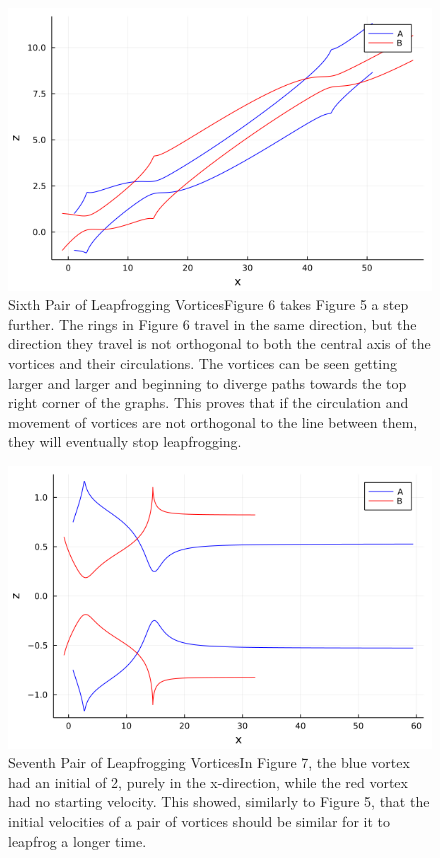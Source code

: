 \documentclass{article}
\begin{document}
\begin{figure}[htb]
	\centering
	\includegraphics[width=\textwidth]{Graph_F.png}
	\caption{Sixth Pair of Leapfrogging Vortices\newline     Figure 6 takes Figure 5 a step further. The rings in Figure 6 travel in the same direction, but the direction they travel is not orthogonal to both the central axis of the vortices and their circulations. The vortices can be seen getting larger and larger and beginning to diverge paths towards the top right corner of the graphs. This proves that if the circulation and movement of vortices are not orthogonal to the line between them, they will eventually stop leapfrogging.}
	\label{fig:vortexpaths}
\end{figure} 

\begin{figure}[htb]
	\centering
	\includegraphics[width=\textwidth]{Graph_G.png}
	\caption{Seventh Pair of Leapfrogging Vortices\newline     In Figure 7, the blue vortex had an initial of 2, purely in the x-direction, while the red vortex had no starting velocity. This showed, similarly to Figure 5, that the initial velocities of a pair of vortices should be similar for it to leapfrog a longer time.}
	\label{fig:vortexpaths}
\end{figure} 
\end{document}
